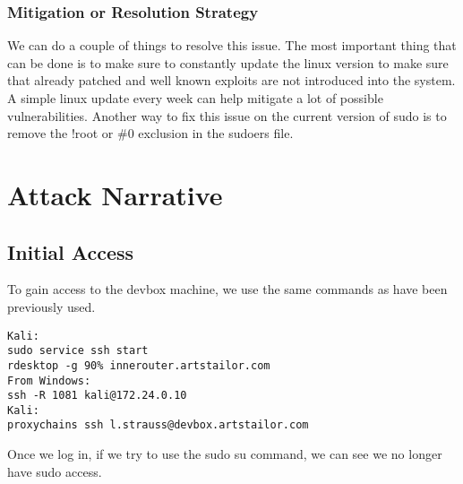 \documentclass[notitlepage]{article}
\begin{document}
    \subsubsection*{Mitigation or Resolution Strategy}
    We can do a couple of things to resolve this issue. The most important thing that can be done is to make sure to constantly update the linux version to make sure
    that already patched and well known exploits are not introduced into the system. A simple linux update every week can help mitigate a lot of possible vulnerabilities. Another way
    to fix this issue on the current version of sudo is to remove the !root or {\#}0 exclusion in the sudoers file.


\section{Attack Narrative}

    \subsection{Initial Access}
    To gain access to the devbox machine, we use the same commands as have been previously used.
\begin{verbatim}
Kali:
sudo service ssh start
rdesktop -g 90% innerouter.artstailor.com
From Windows:
ssh -R 1081 kali@172.24.0.10
Kali:
proxychains ssh l.strauss@devbox.artstailor.com
\end{verbatim}
    Once we log in, if we try to use the sudo su command, we can see we no longer have sudo access.
\end{document}
